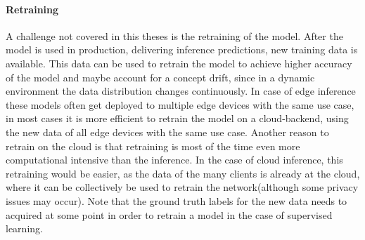 \paragraph{Retraining}
A challenge not covered in this theses  is the retraining of the model. After the model is used in production, delivering inference predictions, new training data is available. This data can be used to retrain the model to achieve higher accuracy of the model and maybe account for a concept drift, since in a dynamic environment the data distribution changes continuously.
In case of edge inference these models often get deployed to multiple edge devices with the same use case, in most cases it is more efficient to retrain the model on a cloud-backend, using the new data of all edge devices with the same use case. Another reason to retrain on the cloud is that retraining is most of the time even more computational intensive than the inference.
In the case of cloud inference, this retraining would be easier, as the data of the many clients is already at the cloud, where it can be collectively be used to retrain the network(although some privacy issues may occur).
Note that the ground truth labels for the new data needs to acquired at some point in order to retrain a model in the case of supervised learning.
\endinput 
